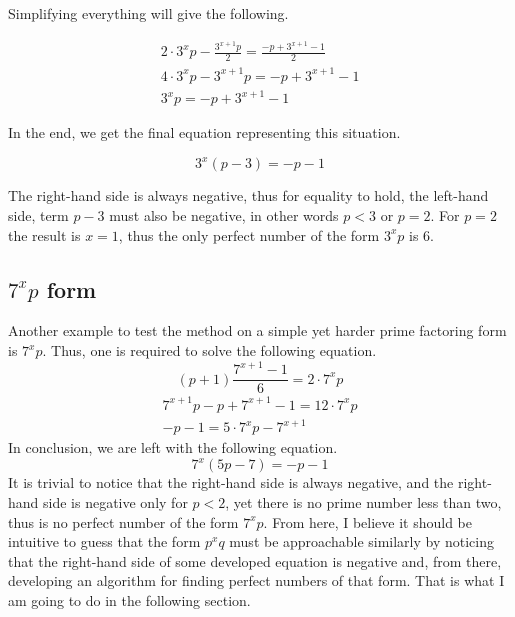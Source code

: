 \documentclass{article}
\begin{document}
Simplifying everything will give the following.

\begin{align*}
	2 \cdot 3^x p - \frac{3^{x + 1} p}{2} = \frac{-p + 3^{x + 1} - 1}{2} \\
	4 \cdot 3^x p - 3^{x + 1} p = -p + 3^{x + 1} - 1 \\
	3^x p = -p + 3^{x + 1} - 1
\end{align*}

In the end, we get the final equation representing this situation.

\begin{equation}
	3^x(p - 3) = -p - 1
\end{equation}

The right-hand side is always negative, thus for equality to hold, the left-hand side, term \(p - 3\) must also be negative, in other words \(p < 3\) or \(p = 2\). For \(p = 2\) the result is \(x = 1\), thus the only perfect number of the form \(3^x p\) is 6.

\subsection{\(7^x p\) form}

Another example to test the method on a simple yet harder prime factoring form is \(7^x p\). Thus, one is required to solve the following equation.
\begin{equation}
    (p + 1) \frac{7^{x + 1} - 1}{6} = 2 \cdot 7^x p
\end{equation}
\begin{align*}
    7^{x + 1}p - p + 7^{x + 1} - 1 = 12 \cdot 7^x p \\
    -p - 1 = 5 \cdot 7^x p -  7^{x + 1}
\end{align*}
In conclusion, we are left with the following equation.
\begin{equation}
    7^x \left ( 5p - 7 \right ) = -p - 1
\end{equation}
It is trivial to notice that the right-hand side is always negative, and the right-hand side is negative only for \(p < 2\), yet there is no prime number less than two, thus is no perfect number of the form \(7^x p\). From here, I believe it should be intuitive to guess that the form \(p^x q\) must be approachable similarly by noticing that the right-hand side of some developed equation is negative and, from there, developing an algorithm for finding perfect numbers of that form. That is what I am going to do in the following section.
\end{document}
